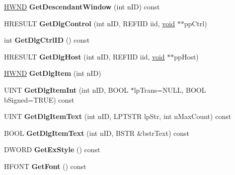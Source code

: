 \begin{DoxyCompactItemize}
\hyperlink{interfacevoid}{H\+W\+ND} {\bfseries Get\+Descendant\+Window} (int n\+ID) const
\item 
\mbox{\label{class_a_t_l_1_1_c_window_a5c1dc9fd05b4abd0b27a7bd42d4c4460}} 
H\+R\+E\+S\+U\+LT {\bfseries Get\+Dlg\+Control} (int n\+ID, R\+E\+F\+I\+ID iid, \hyperlink{interfacevoid}{void} $\ast$$\ast$pp\+Ctrl)
\item 
\mbox{\label{class_a_t_l_1_1_c_window_a2576f38b1eaef57913f7310465ad3e04}} 
int {\bfseries Get\+Dlg\+Ctrl\+ID} () const
\item 
\mbox{\label{class_a_t_l_1_1_c_window_a6edcf8850bf6452ff02390e2cf2e3683}} 
H\+R\+E\+S\+U\+LT {\bfseries Get\+Dlg\+Host} (int n\+ID, R\+E\+F\+I\+ID iid, \hyperlink{interfacevoid}{void} $\ast$$\ast$pp\+Host)
\item 
\mbox{\label{class_a_t_l_1_1_c_window_a9b5063e0a6f9a2abb77ecb6ce3c55216}} 
\hyperlink{interfacevoid}{H\+W\+ND} {\bfseries Get\+Dlg\+Item} (int n\+ID)
\item 
\mbox{\label{class_a_t_l_1_1_c_window_ae1187521463b1fdcd7fe516763f09f12}} 
U\+I\+NT {\bfseries Get\+Dlg\+Item\+Int} (int n\+ID, B\+O\+OL $\ast$lp\+Trans=N\+U\+LL, B\+O\+OL b\+Signed=T\+R\+UE) const
\item 
\mbox{\label{class_a_t_l_1_1_c_window_a044f344a7074f1de033bcc78b21cf77b}} 
U\+I\+NT {\bfseries Get\+Dlg\+Item\+Text} (int n\+ID, L\+P\+T\+S\+TR lp\+Str, int n\+Max\+Count) const
\item 
\mbox{\label{class_a_t_l_1_1_c_window_aad482681d945c8b159aeff2794355c29}} 
B\+O\+OL {\bfseries Get\+Dlg\+Item\+Text} (int n\+ID, B\+S\+TR \&bstr\+Text) const
\item 
\mbox{\label{class_a_t_l_1_1_c_window_a148aebeb70a49642f7f4ef95018d8212}} 
D\+W\+O\+RD {\bfseries Get\+Ex\+Style} () const
\item 
\mbox{\label{class_a_t_l_1_1_c_window_a1ff65931fa25fd3a22ca6f59bf80b478}} 
H\+F\+O\+NT {\bfseries Get\+Font} () const

\end{DoxyCompactItemize}
